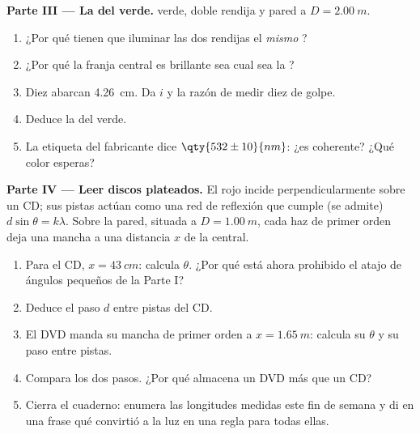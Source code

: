 \begin{problem}
\medskip
\noindent\textbf{Parte III --- La  del  verde.}
 verde, doble rendija y pared a $D = \qty{2.00}{m}$.
\begin{enumerate}[resume]
  \item ¿Por qué tienen que iluminar las dos rendijas el \emph{mismo}
        ?
  \item ¿Por qué la franja central es brillante sea cual sea la ?
  \item Diez  abarcan \qty{4.26}{cm}. Da $i$ y la razón de
        medir diez de golpe.
  \item Deduce la  del  verde.
  \item La etiqueta del fabricante dice $\qty{532 \pm 10}{nm}$: ¿es
        coherente? ¿Qué color esperas?
\end{enumerate}

\medskip
\noindent\textbf{Parte IV --- Leer discos plateados.} El  rojo
incide perpendicularmente sobre un CD; sus pistas actúan como una red de
reflexión que cumple (se admite) $d \sin\theta = k\lambda$. Sobre la
pared, situada a $D = \qty{1.00}{m}$, cada haz de primer orden deja una
mancha a una distancia $x$ de la central.
\begin{enumerate}[resume]
  \item Para el CD, $x = \qty{43}{cm}$: calcula $\theta$. ¿Por qué está
        ahora prohibido el atajo de ángulos pequeños de la Parte I?
  \item Deduce el paso $d$ entre pistas del CD.
  \item El DVD manda su mancha de primer orden a $x = \qty{1.65}{m}$:
        calcula su $\theta$ y su paso entre pistas.
  \item Compara los dos pasos. ¿Por qué almacena un DVD más que un CD?
  \item Cierra el cuaderno: enumera las longitudes medidas este fin de
        semana y di en una frase qué convirtió a la luz en una regla
        para todas ellas.
\end{enumerate}
\end{problem}
